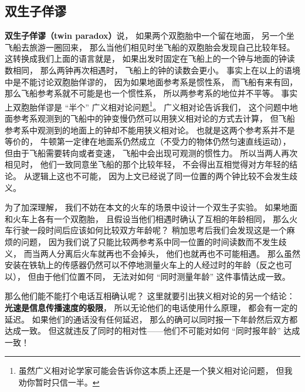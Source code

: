 \subsection{双生子佯谬}
\textbf{双生子佯谬（twin paradox）}说， 如果两个双胞胎中一个留在地面， 另一个坐飞船去旅游一圈回来， 那么当他们相见时坐飞船的双胞胎会发现自己比较年轻。 这转换成我们上面的语言就是， 如果出发时固定在飞船上的一个钟与地面的钟读数相同， 那么两钟再次相遇时， 飞船上的钟的读数会更小。 事实上在以上的语境中是不能讨论双胞胎佯谬的， 因为如果地面参考系是惯性系， 而飞船有来有回， 那么飞船参考系就不可能是也一个惯性系， 所以两参考系的地位并不平等。 事实上双胞胎佯谬是 “半个” 广义相对论问题\footnote{虽然广义相对论学家可能会告诉你这本质上还是一个狭义相对论问题， 但我劝你暂时只信一半。}。 广义相对论告诉我们， 这个问题中地面参考系观测到的飞船中的钟变慢仍然可以用狭义相对论的方式去计算， 但飞船参考系中观测到的地面上的钟却不能用狭义相对论。 也就是这两个参考系并不是等价的， 牛顿第一定律在地面系仍然成立（不受力的物体仍然匀速直线运动）， 但由于飞船需要转向或者变速， 飞船中会出现可观测的惯性力。 所以当两人再次相见时， 他们一致同意坐飞船的那个比较年轻， 不会得出互相觉得对方年轻的结论。 从逻辑上这也不可能， 因为上文已经说了同一位置的两个钟比较不会发生歧义。

为了加深理解， 我们不妨在本文的火车的场景中设计一个双生子实验。 如果地面和火车上各有一个双胞胎， 且假设当他们相遇时确认了互相的年龄相同， 那么火车行驶一段时间后应该如何比较双方年龄呢？ 稍加思考后我们会发现这是一个麻烦的问题， 因为我们说了只能比较两参考系中同一位置的时间读数而不发生歧义， 而当两人分离后火车就再也不会掉头， 他们也就再也不可能相遇。 那么虽然安装在铁轨上的传感器仍然可以不停地测量火车上的人经过时的年龄（反之也可以）， 但由于他们位置不同， 无法对如何 “同时测量年龄” 这件事情达成一致。

那么他们能不能打个电话互相确认呢？ 这里就要引出狭义相对论的另一个结论： \textbf{光速是信息传播速度的极限}， 所以无论他们的电话使用什么原理， 都会有一定的延迟。 如果他们的通话没有任何延迟， 那么的确可以同时报一下年龄然后双方都达成一致。 但这就违反了同时的相对性——他们不可能对如何 “同时报年龄” 达成一致！








